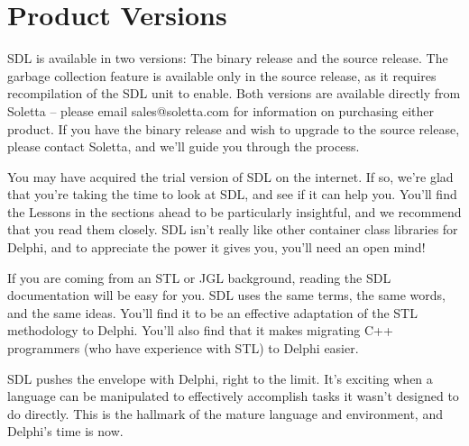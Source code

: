 \documentclass{report}
\begin{document}
\section{Product Versions}

SDL is available in two versions: The binary release and the source release.
The garbage collection feature is available only in the source release, as
it requires recompilation of the SDL unit to enable. Both versions are
available directly from Soletta -- please email sales@soletta.com for
information on purchasing either product. If you have the binary release and
wish to upgrade to the source release, please contact Soletta, and we'll
guide you through the process.

You may have acquired the trial version of SDL on the internet.  If so,
we're glad that you're taking the time to look at SDL, and see if it can
help you. You'll find the Lessons in the sections ahead to be particularly
insightful, and we recommend that you read them closely. SDL isn't really
like other container class libraries for Delphi, and to appreciate the power
it gives you, you'll need an open mind!

If you are coming from an STL or JGL background, reading the SDL
documentation will be easy for you. SDL uses the same terms, the same words,
and the same ideas. You'll find it to be an effective adaptation of the STL
methodology to Delphi.  You'll also find that it makes migrating C++
programmers (who have experience with STL) to Delphi easier.

SDL pushes the envelope with Delphi, right to the limit. It's exciting when
a language can be manipulated to effectively accomplish tasks it wasn't
designed to do directly. This is the hallmark of the mature language and
environment, and Delphi's time is now.
\end{document}
